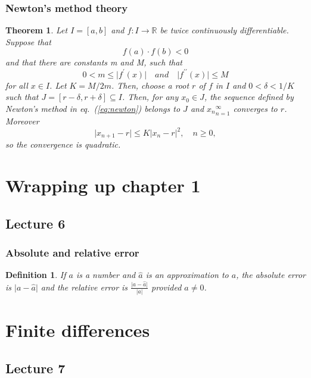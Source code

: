 \documentclass{article}
\newtheorem{theorem}{Theorem}
\newtheorem{definition}{Definition}
\begin{document}
\subsubsection{Newton's method theory}
\begin{theorem}
    Let $I=[a,b]$ and $f:I\to\mathbb{R}$ be twice continuously differentiable. Suppose that
    \begin{equation}
        f(a)\cdot f(b)<0 \nonumber
    \end{equation}
    and that there are constants m and M, such that
    \begin{equation}
        0<m\leq \vert f^\prime(x)\vert\quad and \quad \vert f^{\prime\prime}(x)\vert \leq M
    \end{equation}
    for all $x\in I$. Let $K=M/2m$. Then, choose a root $r$ of $f$ in $I$ and $0<\delta<1/K$ such that $J=[r-\delta,r+\delta]\subseteq I$. Then, for any $x_0\in J$, the sequence defined by Newton's method in eq.~(\ref{eq:newton}) belongs to $J$ and ${x_n}_{n=1}^\infty$ converges to $r$. Moreover
    \begin{equation}
        \vert x_{n+1}-r\vert \leq K\vert x_n-r\vert^2,\quad n\geq0,
    \end{equation}
    so the convergence is quadratic.
\end{theorem}


\section{Wrapping up chapter 1}
\subsection{Lecture 6}
\subsubsection{Absolute and relative error}
\begin{definition}
    If $a$ is a number and $\hat{a}$ is an approximation to $a$, the absolute error is $\vert a-\hat{a}\vert$ and the relative error is $\frac{\vert a-\hat{a}\vert}{\vert a \vert}$ provided $a\neq0$.  
\end{definition}


\section{Finite differences}
\subsection{Lecture 7}
\end{document}
